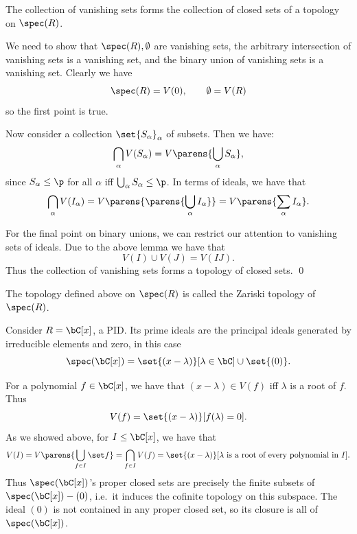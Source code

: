 \bprop

    The collection of vanishing sets forms the collection of closed sets of a topology on $\spec(R)$.

\eprop

\bproof

    We need to show that $\spec(R),\emptyset$ are vanishing sets, the arbitrary intersection of vanishing sets is a vanishing set, and the binary
    union of vanishing sets is a vanishing set.
    Clearly we have
    $$ \spec(R) = V(0),\qquad \emptyset = V(R) $$
    so the first point is true.

    Now consider a collection $\set{S_\alpha}_\alpha$ of subsets.
    Then we have:
    $$ \bigcap_\alpha V(S_\alpha) = V\parens{\bigcup_\alpha S_\alpha} , $$
    since $S_\alpha\leq\p$ for all $\alpha$ iff $\bigcup_\alpha S_\alpha\leq\p$.
    In terms of ideals, we have that
    $$ \bigcap_\alpha V(I_\alpha) = V\parens{\parens{\bigcup_\alpha I_\alpha}} = V\parens{\sum_\alpha I_\alpha} . $$

    For the final point on binary unions, we can restrict our attention to vanishing sets of ideals.
    Due to the above lemma we have that
    $$ V(I) \cup V(J) = V(IJ) . $$
    Thus the collection of vanishing sets forms a topology of closed sets.
    \qed

\eproof

\bdefn

    The topology defined above on $\spec(R)$ is called the {\emphcolor Zariski topology} of $\spec(R)$.

\edefn

\bexam

    Consider $R=\bC[x]$, a PID.
    Its prime ideals are the principal ideals generated by irreducible elements and zero, in this case
    $$ \spec(\bC[x]) = \set{(x-\lambda)}[\lambda\in\bC]\cup\set{(0)} . $$

    For a polynomial $f\in\bC[x]$, we have that $(x-\lambda)\in V(f)$ iff $\lambda$ is a root of $f$.
    Thus
    $$ V(f) = \set{(x-\lambda)}[f(\lambda)=0] . $$
    As we showed above, for $I\leq\bC[x]$, we have that
    $$ V(I) = V\parens{\bigcup_{f\in I}\set f} = \bigcap_{f\in I}V(f) = \set{(x-\lambda)}[\hbox{$\lambda$ is a root of every polynomial in $I$}] . $$
    Thus $\spec(\bC[x])$'s proper closed sets are precisely the finite subsets of $\spec(\bC[x])-(0)$, i.e.\ it induces the cofinite topology on this subspace.
    The ideal $(0)$ is not contained in any proper closed set, so its closure is all of $\spec(\bC[x])$.

